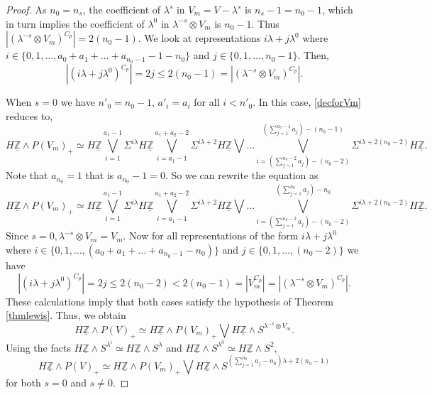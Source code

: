 \documentclass[a4paper,leqno,11pt]{amsart}
\theoremstyle{plain}
\theoremstyle{definition}
\theoremstyle{remark}
\theoremstyle{definition}
\newcommand{\uZ}{\underline{\mathbb{Z}}}
\numberwithin{equation}{section}
\newcommand{\smas}{\wedge}
\begin{document}
\begin{proof}
		As $n_0 = n_s$, the coefficient of $\lambda^s$  in  $V_m = V-\lambda^s$  is  $n_s - 1 = n_0 -1$, which in turn implies the coefficient of  $\lambda^0$   in  $\lambda^{-s}\otimes V_m$  is $n_0 -1$. Thus $ |(\lambda^{-s}\otimes V_m)^{C_p}| = 2(n_0 - 1)$. We look at representations $i\lambda +j\lambda^0$ where $i \in \{0,1, \dots , a_0+a_1+\dots + a_{n_0 -1} -1- n_0\}$ and $j \in \{0,1,\dots , n_0 -1 \}$. Then,
		$$|(i\lambda + j\lambda^0)^{C_p}| = 2j \leq 2(n_0 - 1) = |(\lambda^{-s}\otimes V_m)^{C_p}|.$$
		
		When $s = 0 $ we have $ n'_0 = n_0-1$, $a'_i = a_i$ for all $i<n'_0$. In this case, \eqref{decforVm} reduces to,
		$$H\uZ\smas P(V_m)_+ \simeq H\uZ\bigvee_{i=1}^{a_1-1}\Sigma^{i\lambda} H\uZ\bigvee_{i=a_1-1}^{a_1+a_2-2} \Sigma^{i\lambda+2}H\uZ\bigvee \dots \bigvee_{i=(\sum_{j=1}^{n_0-2}a_{j})-(n_0-2)}^{(\sum_{j=1}^{n_0-1}a_{j})- (n_0-1) } \Sigma^{i\lambda + 2(n_0-2)}H\uZ.$$  
		Note that $a_{n_0}= 1 $ that  is $a_{n_0}-1=0$. So  we  can rewrite the equation as 
		$$H\uZ\smas P(V_m)_+ \simeq H\uZ\bigvee_{i=1}^{a_1-1}\Sigma^{i\lambda} H\uZ\bigvee_{i=a_1-1}^{a_1+a_2-2} \Sigma^{i\lambda+2}H\uZ\bigvee \dots \bigvee_{i=(\sum_{j=1}^{n_0-2}a_{j})-(n_0-2)}^{(\sum_{j=1}^{n_0}a_{j})- n_0 }\Sigma^{i\lambda + 2(n_0-2)}H\uZ.$$
		Since $s=0, \lambda^{-s}\otimes V_m = V_m$. Now for all representations of the form $i\lambda + j\lambda^0$ where $i \in \{0,1,\dots, (a_0+a_1+\dots + a_{n_0 - 1}-n_0) \}$ and $j \in \{0,1,\dots,(n_0 - 2)\}$ we have 
		$$|(i\lambda + j\lambda^0)^{C_p}| = 2j \leq 2(n_0-2) < 2(n_0 -1) = |V_{m}^{C_p}| = |(\lambda^{-s}\otimes V_m)^{C_p}|.$$
		These calculations imply that both cases satisfy the hypothesis of Theorem \ref{thmlewis}. Thus, we obtain  
		$$H\uZ \smas P(V)_+ \simeq H\uZ \smas P(V_m)_+\bigvee H\uZ \smas S^{\lambda^{-s}\otimes V_m}.$$
		Using the facts $H\uZ\smas S^{\lambda^i} \simeq H\uZ \smas S^{\lambda}$ and $H\uZ\smas S^{\lambda^0} \simeq H\uZ \smas S^2$, 
		$$H\uZ\smas P(V)_+ \simeq  H\uZ\smas P(V_m)_+ \bigvee H\uZ\smas  S^{(\sum_{j=1}^{n_{0}}a_j - n_0) \lambda + 2(n_0 -1)}$$ 
		for both $s=0$ and $s\neq 0$.
	\end{proof}
	
\end{document}
